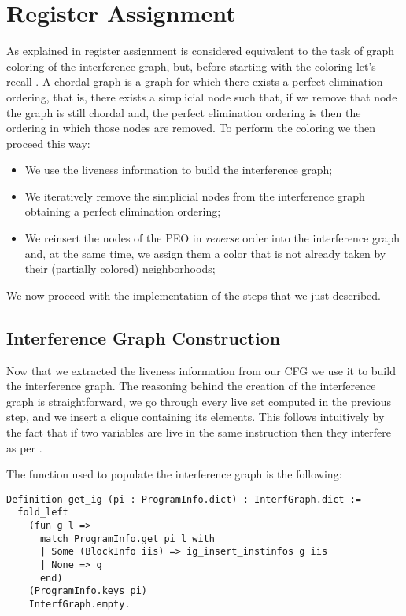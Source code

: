 \section{Register Assignment}
\label{sec:ra}

As explained in  register assignment is considered equivalent to the task of graph coloring of the interference graph, but, before starting with the coloring let's recall . A chordal graph is a graph for which there exists a perfect elimination ordering, that is, there exists a simplicial node such that, if we remove that node the graph is still chordal and, the perfect elimination ordering is then the ordering in which those nodes are removed.
To perform the coloring we then proceed this way:
\begin{itemize}
  \item We use the liveness information to build the interference graph;
  \item We iteratively remove the simplicial nodes from the interference graph obtaining a perfect elimination ordering;
  \item We reinsert the nodes of the PEO in \textit{reverse} order into the interference graph and, at the same time, we assign them a color that is not already taken by their (partially colored) neighborhoods;
\end{itemize}

We now proceed with the implementation of the steps that we just described.

\subsection{Interference Graph Construction}

Now that we extracted the liveness information from our CFG we use it to build the interference graph.
The reasoning behind the creation of the interference graph is straightforward, we go through every live set computed in the previous step, and we insert a clique containing its elements. This follows intuitively by the fact that if two variables are live in the same instruction then they interfere as per .

The function used to populate the interference graph is the following:

\begin{lstlisting}[style=Coq]
Definition get_ig (pi : ProgramInfo.dict) : InterfGraph.dict :=
  fold_left
    (fun g l =>
      match ProgramInfo.get pi l with
      | Some (BlockInfo iis) => ig_insert_instinfos g iis
      | None => g
      end)
    (ProgramInfo.keys pi)
    InterfGraph.empty.
\end{lstlisting}

